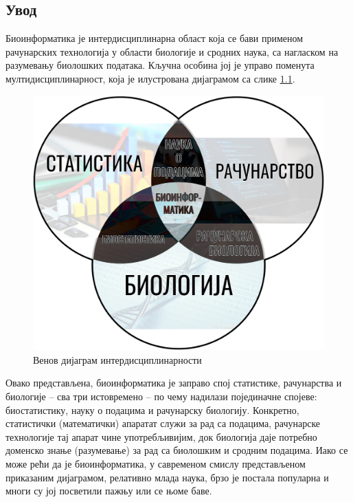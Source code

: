 \documentclass[12pt,oneside]{memoir}
\begin{document}
\begin{CJK}{UTF8}{ipxm}
\frontmatter
\naslovna
\komisija
\apstrakt
\tableofcontents*

\mainmatter

\chapter{Увод}
Биоинформатика је интердисциплинарна област која се бави применом рачунарских технологија у области биологије и сродних наука, са нагласком на разумевању биолошких података. Кључна особина јој је управо поменута мултидисциплинарност, која је илустрована дијаграмом са слике \ref{fig:venn}.

\begin{figure}[H]
  \centering
  \includegraphics[width=.75\textwidth]{bioinformatika.png}
  \caption{Венов дијаграм интердисциплинарности\cite{venn}}
  \label{fig:venn}
\end{figure}

Овако представљена, биоинформатика је заправо спој статистике, рачунарства и биологије -- сва три истовремено -- по чему надилази појединачне спојеве: биостатистику, науку о подацима и рачунарску биологију. Конкретно, статистички (математички) апаратат служи за рад са подацима, рачунарске технологије тај апарат чине употребљивијим, док биологија даје потребно доменско знање (разумевање) за рад са биолошким и сродним подацима. Иако се може рећи да је биоинформатика, у савременом смислу представљеном приказаним дијаграмом, релативно млада наука, брзо је постала популарна и многи су јој посветили пажњу или се њоме баве\cite{ufpr, cmero2015, fauziyyah2019}.


\end{CJK}
\end{document}
